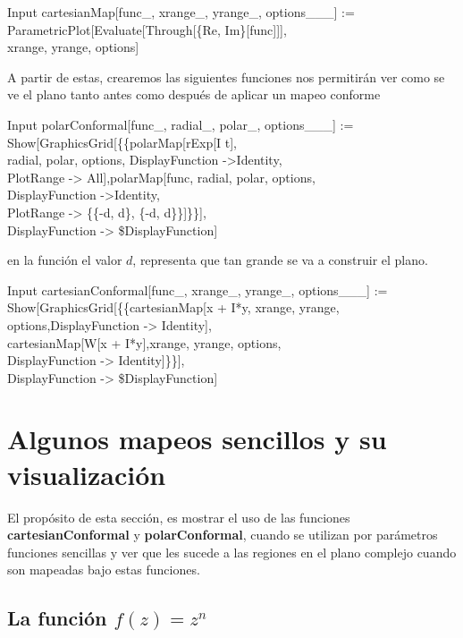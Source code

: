\begin{mmaCell}{Input}
  cartesianMap[func_, xrange_, yrange_, options___] := \\ParametricPlot[Evaluate[Through[\{Re, Im\}[func]]],\\ xrange, yrange, options]
\end{mmaCell}

A partir de estas, crearemos las siguientes funciones nos permitirán ver como se ve el plano tanto antes como después de aplicar un mapeo conforme
\begin{mmaCell}{Input}
	 polarConformal[func_, radial_, polar_, options___] :=\\Show[GraphicsGrid[\{\{polarMap[rExp[I t],\\radial, polar, options, DisplayFunction ->Identity,\\PlotRange -> All],polarMap[func, radial, polar, options,\\DisplayFunction ->Identity,\\PlotRange -> \{\{-d, d\}, \{-d, d\}\}]\}\}],\\DisplayFunction -> \$DisplayFunction]
\end{mmaCell}
en la función el valor $d$, representa que tan grande se va a construir el plano.
\begin{mmaCell}{Input}
	 cartesianConformal[func_, xrange_, yrange_, options___] :=\\Show[GraphicsGrid[\{\{cartesianMap[x + I*y, xrange, yrange,\\options,DisplayFunction -> Identity],\\cartesianMap[W[x + I*y],xrange, yrange, options,\\DisplayFunction -> Identity]\}\}],\\DisplayFunction -> \$DisplayFunction]
\end{mmaCell}


\section{Algunos mapeos sencillos y su visualización} \label{mum}
El propósito de esta sección, es mostrar el uso de las funciones \textbf{cartesianConformal} y \textbf{polarConformal}, cuando se utilizan por parámetros funciones sencillas y ver que les sucede a las regiones en el plano complejo cuando son mapeadas bajo estas funciones. 
\subsection{La función $f(z)=z^n$}


